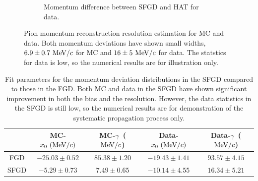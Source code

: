\begin{figure}[ht]
\begin{subfigure}{\dbfigwid\textwidth}
          \caption{Momentum difference between SFGD and HAT for data.}
          \label{subfig:sfgp-hatp-dif-data}
          \end{subfigure}
          \caption{Pion momentum reconstruction resolution estimation for MC and data. Both momentum deviations have shown small widths, $6.9\pm0.7~\textrm{MeV}/c$ for MC and $16\pm5~\textrm{MeV}/c$ for data. The statstics for data is low, so the numerical results are for illustration only.}
          \label{fig:sppi-res}
          \end{figure}

          \begin{table}[ht]
          \centering
          \begin{tabular}{c|cccc}
                       & MC-$x_0~(\textrm{MeV}/c)$ & MC-$\gamma$~($\textrm{MeV}/c$) & Data-$x_0~(\textrm{MeV}/c)$ & Data-$\gamma$~($\textrm{MeV}/c$)\\
          \hline
          FGD & $-25.03 \pm 0.52$ & $85.38 \pm 1.20$ & $-19.43 \pm 1.41$ & $93.57 \pm 4.15$ \\
          SFGD & $-5.29 \pm 0.73$  & $7.49 \pm 0.65$  & $-10.14 \pm 4.55$  & $16.34 \pm 5.21$ \\
          \end{tabular}
          \caption{Fit parameters for the momentum deviation distributions in the SFGD compared to those in the FGD. Both MC and data in the SFGD have shown significant improvement in both the bias and the resolution. However, the data statistics in the SFGD is still low, so the numerical results are for demonstration of the systematic propagation process only.}
          \label{tab:sppi-res}
          \end{table}

